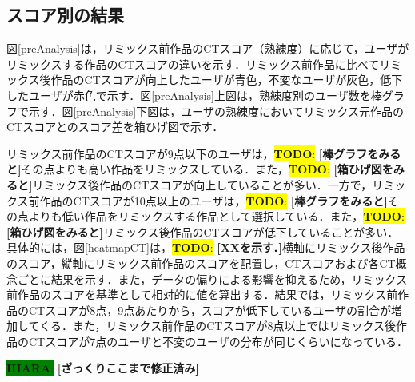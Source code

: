 \documentclass[submit,techrep,noauthor]{ipsj}
\newcommand{\todo}[1]{\colorbox{yellow}{{\bf TODO}:}{\color{red} {\textbf{[#1]}}}}
\newcommand{\ihara}[1]{\colorbox{green}{{\bf IHARA}:}{\color{blue} {\textbf{[#1]}}}}
\newcommand{\memo}[1]{\colorbox{magenta!30}{\textbf{MEMO}}{\color{red!50}\textbf{[#1]}}}
\begin{document}
\subsection{スコア別の結果}

図\ref{preAnalysis}は，リミックス前作品のCTスコア（熟練度）に応じて，ユーザがリミックスする作品のCTスコアの違いを示す．リミックス前作品に比べてリミックス後作品のCTスコアが向上したユーザが青色，不変なユーザが灰色，低下したユーザが赤色で示す．図\ref{preAnalysis}上図は，熟練度別のユーザ数を棒グラフで示す．図\ref{preAnalysis}下図は，ユーザの熟練度においてリミックス元作品のCTスコアとのスコア差を箱ひげ図で示す．


リミックス前作品のCTスコアが9点以下のユーザは，\todo{棒グラフをみると}その点よりも高い作品をリミックスしている．また，\todo{箱ひげ図をみると}リミックス後作品のCTスコアが向上していることが多い．一方で，リミックス前作品のCTスコアが10点以上のユーザは，\todo{棒グラフをみると}その点よりも低い作品をリミックスする作品として選択している．また，\todo{箱ひげ図をみると}リミックス後作品のCTスコアが低下していることが多い．具体的には，図\ref{heatmapCT}は，\todo{XXを示す．}横軸にリミックス後作品のスコア，縦軸にリミックス前作品のスコアを配置し，CTスコアおよび各CT概念ごとに結果を示す．また，データの偏りによる影響を抑えるため，リミックス前作品のスコアを基準として相対的に値を算出する．結果では，リミックス前作品のCTスコアが8点，9点あたりから，スコアが低下しているユーザの割合が増加してくる．また，リミックス前作品のCTスコアが8点以上ではリミックス後作品のCTスコアが7点のユーザと不変のユーザの分布が同じくらいになっている．

\ihara{ざっくりここまで修正済み}



\end{document}

